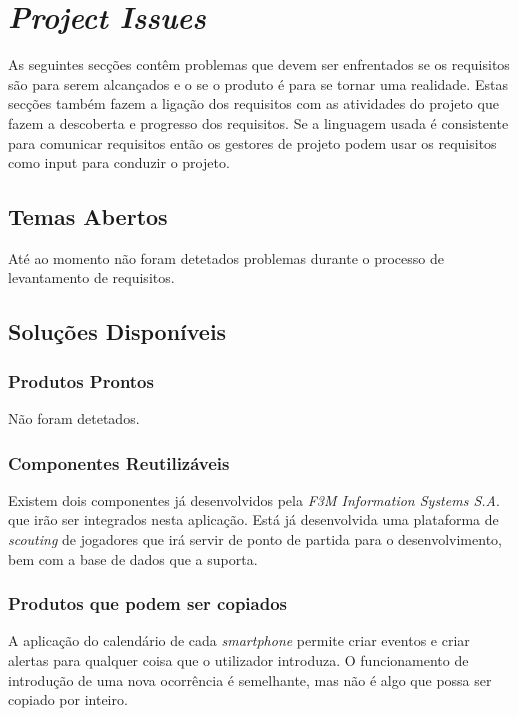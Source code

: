 \chapter{\emph{Project Issues}}

As seguintes secções contêm problemas que devem ser enfrentados se os requisitos são para serem alcançados e o se o produto é para se tornar uma realidade.
Estas secções também fazem a ligação dos requisitos com as atividades do projeto que fazem a descoberta e progresso dos requisitos. Se a linguagem usada é consistente para comunicar requisitos então os gestores de projeto podem usar os requisitos como input para conduzir o projeto.

\section{Temas Abertos}

Até ao momento não foram detetados problemas durante o processo de levantamento de requisitos.

\section{Soluções Disponíveis}

\subsection{Produtos Prontos}
Não foram detetados.

\subsection{Componentes Reutilizáveis}

Existem dois componentes já desenvolvidos pela \emph{F3M Information Systems S.A}. que irão ser integrados nesta aplicação. Está já desenvolvida uma plataforma de \emph{scouting} de jogadores que irá servir de ponto de partida para o desenvolvimento, bem com a base de dados que a suporta. 

\subsection{Produtos que podem ser copiados}

A aplicação do calendário de cada \emph{smartphone} permite criar eventos e criar alertas para qualquer coisa que o utilizador introduza. O funcionamento de introdução de uma nova ocorrência é semelhante, mas não é algo que possa ser copiado por inteiro.

